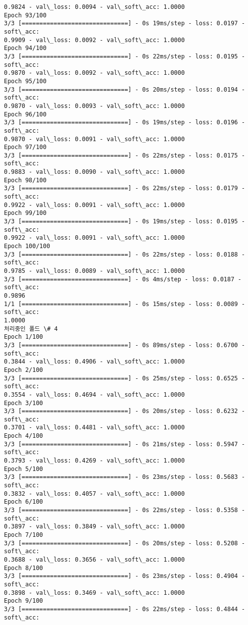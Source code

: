 \documentclass[11pt]{article}
\begin{document}
\begin{Verbatim}[commandchars=\\\{\}]
0.9824 - val\_loss: 0.0094 - val\_soft\_acc: 1.0000
Epoch 93/100
3/3 [==============================] - 0s 19ms/step - loss: 0.0197 - soft\_acc:
0.9909 - val\_loss: 0.0092 - val\_soft\_acc: 1.0000
Epoch 94/100
3/3 [==============================] - 0s 22ms/step - loss: 0.0195 - soft\_acc:
0.9870 - val\_loss: 0.0092 - val\_soft\_acc: 1.0000
Epoch 95/100
3/3 [==============================] - 0s 20ms/step - loss: 0.0194 - soft\_acc:
0.9870 - val\_loss: 0.0093 - val\_soft\_acc: 1.0000
Epoch 96/100
3/3 [==============================] - 0s 19ms/step - loss: 0.0196 - soft\_acc:
0.9870 - val\_loss: 0.0091 - val\_soft\_acc: 1.0000
Epoch 97/100
3/3 [==============================] - 0s 22ms/step - loss: 0.0175 - soft\_acc:
0.9883 - val\_loss: 0.0090 - val\_soft\_acc: 1.0000
Epoch 98/100
3/3 [==============================] - 0s 22ms/step - loss: 0.0179 - soft\_acc:
0.9922 - val\_loss: 0.0091 - val\_soft\_acc: 1.0000
Epoch 99/100
3/3 [==============================] - 0s 19ms/step - loss: 0.0195 - soft\_acc:
0.9922 - val\_loss: 0.0091 - val\_soft\_acc: 1.0000
Epoch 100/100
3/3 [==============================] - 0s 22ms/step - loss: 0.0188 - soft\_acc:
0.9785 - val\_loss: 0.0089 - val\_soft\_acc: 1.0000
3/3 [==============================] - 0s 4ms/step - loss: 0.0187 - soft\_acc:
0.9896
1/1 [==============================] - 0s 15ms/step - loss: 0.0089 - soft\_acc:
1.0000
처리중인 폴드 \# 4
Epoch 1/100
3/3 [==============================] - 0s 89ms/step - loss: 0.6700 - soft\_acc:
0.3844 - val\_loss: 0.4906 - val\_soft\_acc: 1.0000
Epoch 2/100
3/3 [==============================] - 0s 25ms/step - loss: 0.6525 - soft\_acc:
0.3554 - val\_loss: 0.4694 - val\_soft\_acc: 1.0000
Epoch 3/100
3/3 [==============================] - 0s 20ms/step - loss: 0.6232 - soft\_acc:
0.3701 - val\_loss: 0.4481 - val\_soft\_acc: 1.0000
Epoch 4/100
3/3 [==============================] - 0s 21ms/step - loss: 0.5947 - soft\_acc:
0.3793 - val\_loss: 0.4269 - val\_soft\_acc: 1.0000
Epoch 5/100
3/3 [==============================] - 0s 23ms/step - loss: 0.5683 - soft\_acc:
0.3832 - val\_loss: 0.4057 - val\_soft\_acc: 1.0000
Epoch 6/100
3/3 [==============================] - 0s 22ms/step - loss: 0.5358 - soft\_acc:
0.3897 - val\_loss: 0.3849 - val\_soft\_acc: 1.0000
Epoch 7/100
3/3 [==============================] - 0s 20ms/step - loss: 0.5208 - soft\_acc:
0.3688 - val\_loss: 0.3656 - val\_soft\_acc: 1.0000
Epoch 8/100
3/3 [==============================] - 0s 23ms/step - loss: 0.4904 - soft\_acc:
0.3898 - val\_loss: 0.3469 - val\_soft\_acc: 1.0000
Epoch 9/100
3/3 [==============================] - 0s 22ms/step - loss: 0.4844 - soft\_acc:

\end{Verbatim}
\end{document}
